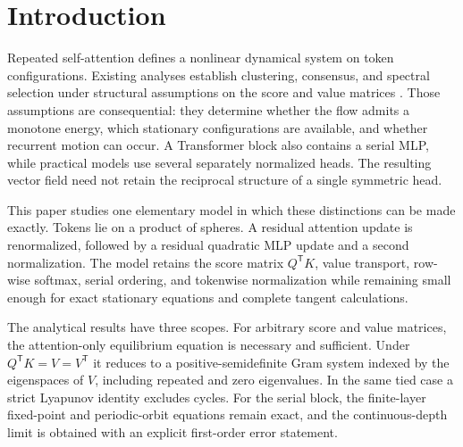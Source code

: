 \documentclass[11pt,a4paper]{article}
\theoremstyle{definition}
\begin{document}
\begin{abstract}
A 30,656-trajectory settling-time atlas tests a recent fractal interpretation of
recurrent reasoning.  Co-moving zooms near a synchronized saddle--node give fitted
uncertainty slopes from $1.03$ to $0.66$.  At the deepest zoom, the set excluded by
the combined speed-and-root-distance audit remains one strip whose affine-edge
residual is below $0.30$ pixel RMS.  All full-interval tangent exponents for the three audited
trajectories are negative.  The
local fold normal form gives an uncertainty exponent $1/2$ for a smooth singular set,
while its hyperbolic continuation approaches exponent one only after fixed-window
resolution refinement.  At the tested scales, the observed map quantitatively matches
critical slowing and does not establish a fractal boundary.
\end{abstract}

\clearpage
\begingroup
\small
\tableofcontents
\endgroup
\newpage

\section{Introduction}

Repeated self-attention defines a nonlinear dynamical system on token
configurations.  Existing analyses establish clustering, consensus, and spectral
selection under structural assumptions on the score and value matrices
\cite{geshkovski2023clusters,burger2025layernorm,altafini2025multistability,
kuehnyoon2026spectral}.
Those assumptions are consequential: they determine whether the flow admits a
monotone energy, which stationary configurations are available, and whether recurrent
motion can occur.  A Transformer block also contains a serial MLP, while practical
models use several separately normalized heads.  The resulting vector field need not
retain the reciprocal structure of a single symmetric head.

This paper studies one elementary model in which these distinctions can be made
exactly.  Tokens lie on a product of spheres.  A residual attention update is
renormalized, followed by a residual quadratic MLP update and a second normalization.
The model retains the score matrix $Q^{\mathsf T}K$, value transport, row-wise softmax,
serial ordering, and tokenwise normalization while remaining small enough for exact
stationary equations and complete tangent calculations.

The analytical results have three scopes.  For arbitrary score and value matrices,
the attention-only equilibrium equation is necessary and sufficient.  Under
$Q^{\mathsf T}K=V=V^{\mathsf T}$ it reduces to a positive-semidefinite Gram system
indexed by the eigenspaces of $V$, including repeated and zero eigenvalues.  In the
same tied case a strict Lyapunov identity excludes cycles.  For the serial block, the
finite-layer fixed-point and periodic-orbit equations remain exact, and the
continuous-depth limit is obtained with an explicit first-order error statement.
\end{document}
